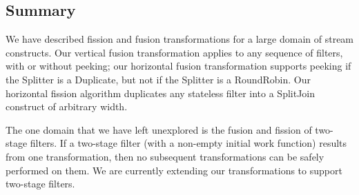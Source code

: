 \subsection{Summary}

We have described fission and fusion transformations for a large
domain of stream constructs.  Our vertical fusion transformation
applies to any sequence of filters, with or without peeking; our
horizontal fusion transformation supports peeking if the Splitter is a
Duplicate, but not if the Splitter is a RoundRobin.  Our horizontal
fission algorithm duplicates any stateless filter into a SplitJoin
construct of arbitrary width.

The one domain that we have left unexplored is the fusion and fission
of two-stage filters.  If a two-stage filter (with a non-empty initial
work function) results from one transformation, then no subsequent
transformations can be safely performed on them.  We are currently
extending our transformations to support two-stage filters.



